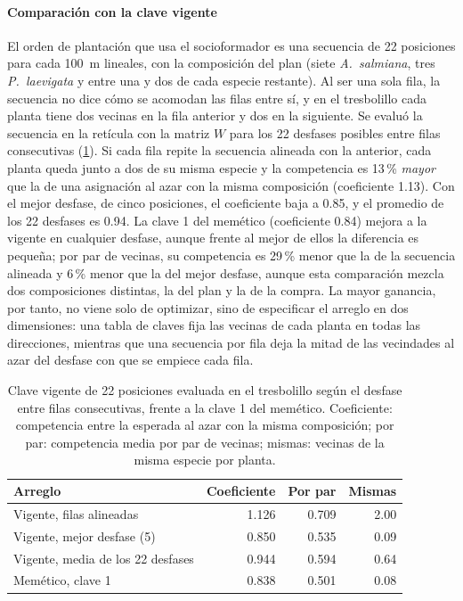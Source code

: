 \paragraph{Comparación con la clave vigente} El orden de plantación que usa el socioformador es una secuencia de 22 posiciones para cada 100~m lineales, con la composición del plan (siete \textit{A.~salmiana}, tres \textit{P.~laevigata} y entre una y dos de cada especie restante). Al ser una sola fila, la secuencia no dice cómo se acomodan las filas entre sí, y en el tresbolillo cada planta tiene dos vecinas en la fila anterior y dos en la siguiente. Se evaluó la secuencia en la retícula con la matriz $W$ para los 22 desfases posibles entre filas consecutivas (\cref{tab:clave-vigente}). Si cada fila repite la secuencia alineada con la anterior, cada planta queda junto a dos de su misma especie y la competencia es 13\,\% \emph{mayor} que la de una asignación al azar con la misma composición (coeficiente 1.13). Con el mejor desfase, de cinco posiciones, el coeficiente baja a 0.85, y el promedio de los 22 desfases es 0.94. La clave 1 del memético (coeficiente 0.84) mejora a la vigente en cualquier desfase, aunque frente al mejor de ellos la diferencia es pequeña; por par de vecinas, su competencia es 29\,\% menor que la de la secuencia alineada y 6\,\% menor que la del mejor desfase, aunque esta comparación mezcla dos composiciones distintas, la del plan y la de la compra. La mayor ganancia, por tanto, no viene solo de optimizar, sino de especificar el arreglo en dos dimensiones: una tabla de claves fija las vecinas de cada planta en todas las direcciones, mientras que una secuencia por fila deja la mitad de las vecindades al azar del desfase con que se empiece cada fila.

\begin{table}[t]
\centering
\caption{Clave vigente de 22 posiciones evaluada en el tresbolillo según el desfase entre filas consecutivas, frente a la clave 1 del memético. Coeficiente: competencia entre la esperada al azar con la misma composición; por par: competencia media por par de vecinas; mismas: vecinas de la misma especie por planta.}
\label{tab:clave-vigente}
\small
\begin{tabular}{@{}lrrr@{}}
\toprule
Arreglo & Coeficiente & Por par & Mismas \\
\midrule
Vigente, filas alineadas & 1.126 & 0.709 & 2.00 \\
Vigente, mejor desfase (5) & 0.850 & 0.535 & 0.09 \\
Vigente, media de los 22 desfases & 0.944 & 0.594 & 0.64 \\
Memético, clave 1 & 0.838 & 0.501 & 0.08 \\
\bottomrule
\end{tabular}
\end{table}

